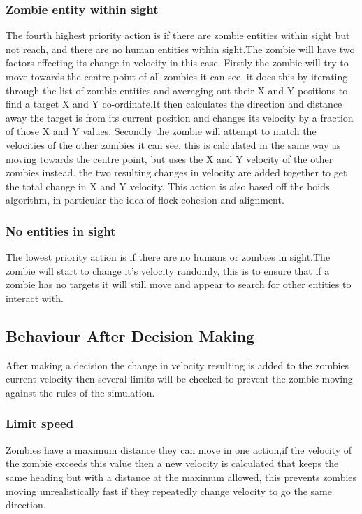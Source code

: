 \subsubsection{Zombie entity within sight}
The fourth highest priority action is if there are zombie entities within sight but not reach, and there are no human entities within sight.The zombie will have two factors effecting its change in velocity in this case. Firstly the zombie will try to move towards the centre point of all zombies it can see, it does this by iterating through the list of zombie entities and averaging out their X and Y positions to find a target X and Y co-ordinate.It then calculates the direction and distance away the target is from its current position and changes its velocity by a fraction of those X and Y values.
Secondly the zombie will attempt to match the velocities of the other zombies it can see, this is calculated in the same way as moving towards the centre point, but uses the X and Y velocity of the other zombies instead.
the two resulting changes in velocity are added together to get the total change in X and Y velocity.
This action is also based off the boids algorithm, in particular the idea of flock cohesion and alignment.
\subsubsection{No entities in sight}
The lowest priority action is if there are no humans or zombies in sight.The zombie will start to change it's velocity randomly, this is to ensure that if a zombie has no targets it will still move and appear to search for other entities to interact with.

\subsection{Behaviour After Decision Making}
After making a decision the change in velocity resulting is added to the zombies current velocity then several limits will be checked to prevent the zombie moving against the rules of the simulation.

\subsubsection{Limit speed}
Zombies have a maximum distance they can move in one action,if the velocity of the zombie exceeds this value then a new velocity is calculated that keeps the same heading but with a distance at the maximum allowed, this prevents zombies moving unrealistically fast if they repeatedly change velocity to go the same direction.

